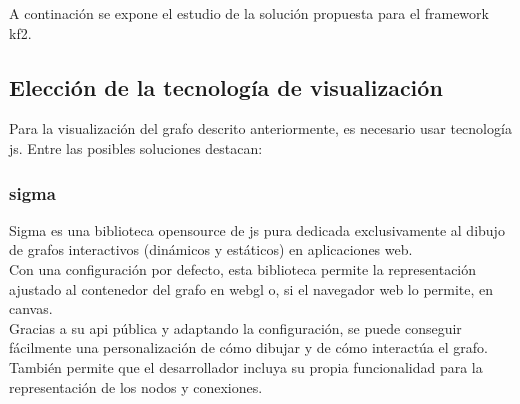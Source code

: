 \begin{comment}

Frontend: Vaadin, GTK, buscar otros, creando un nuevo elemento, muy complejo crear adaptar el comportamiento de los existentes
Backend: adaptar el anterior sistema de importación mejorar rendimiento de las consultas...

usando MVN Excpliarlo 
Frontend nuevo componente JS, con los frameworks ...Cytoscape, sigma.js cargar grafo desde Neo4j o RDF crear imagen Canvas, 
Backend o importancion, adaptar el anterior y crear un servicio web
rediseñarlo usando solr para mejorar la importacion 

Seguridad
control de acceso de los usuarios
MoltMT de solr security
Crear un servico web con filtro de usuarios

estilos:
CSS directamente o SASS

otras cosas:
crossfilter timeline zoom, futuras mejoras...
\end{comment}

A continación se expone el estudio de la solución propuesta para el \gls{framework} \gls{kf2}.

\subsection{Elección de la tecnología de visualización}
Para la visualización del grafo descrito anteriormente, es necesario usar tecnología \gls{js}. Entre las posibles soluciones destacan:

\subsubsection{\gls{sigma}}
Sigma es una biblioteca \gls{opensource} de \gls{js} pura dedicada exclusivamente al dibujo de grafos interactivos (dinámicos y estáticos)  en aplicaciones web. \\

Con una configuración por defecto, esta biblioteca permite la representación ajustado al contenedor del grafo en \gls{webgl} o, si el navegador web lo permite, en \gls{canvas}.\\

Gracias a su \gls{api} pública y adaptando la configuración, se puede conseguir fácilmente 
una personalización de cómo dibujar y de cómo interactúa el grafo. También permite que el desarrollador incluya su propia funcionalidad para la representación de los nodos y conexiones.\\

